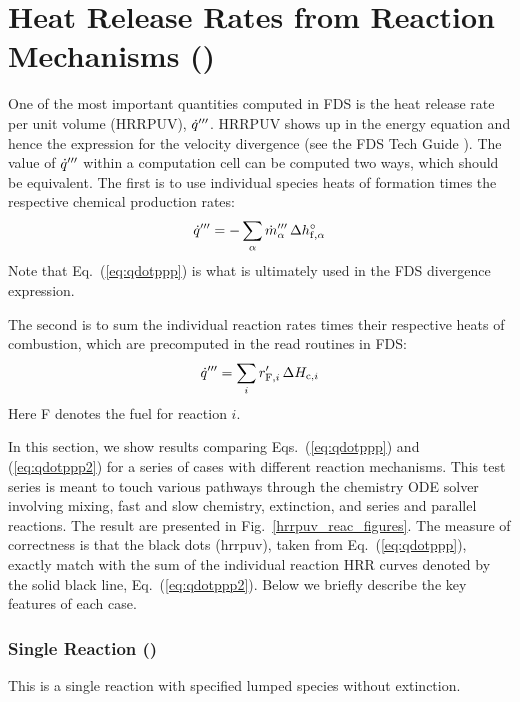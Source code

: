 \documentclass[11pt]{book}
\begin{document}
\clearpage

\section{Heat Release Rates from Reaction Mechanisms ()}
\label{hrrpuv_reac}
\label{hrrpuv_reac_arrhenius}
\label{hrrpuv_reac_extinction}
\label{hrrpuv_reac_parallel}
\label{hrrpuv_reac_parallel_2}
\label{hrrpuv_reac_series}
\label{hrrpuv_reac_simple}
\label{hrrpuv_reac_single}
\label{hrrpuv_reac_soot}

One of the most important quantities computed in FDS is the heat release rate per unit volume (HRRPUV), $\dot{q}^{{\prime\prime\prime}}$.  HRRPUV shows up in the energy equation and hence the expression for the velocity divergence (see the FDS Tech Guide \cite{FDS_Math_Guide}).  The value of $\dot{q}^{{\prime\prime\prime}}$ within a computation cell can be computed two ways, which should be equivalent.  The first is to use individual species heats of formation times the respective chemical production rates:
\begin{equation}
\label{eq:qdotppp}
\dot{q}^{{\prime\prime\prime}} = - \sum_\alpha \dot{m}_\alpha^{{\prime\prime\prime}} \, \Delta h_{{\rm f},\alpha}^\circ
\end{equation}
Note that Eq.~(\ref{eq:qdotppp}) is what is ultimately used in the FDS divergence expression.

The second is to sum the individual reaction rates  times their respective heats of combustion, which are precomputed in the read routines in FDS:
\begin{equation}
\label{eq:qdotppp2}
\dot{q}^{{\prime\prime\prime}} = \sum_i r_{{\rm F},i}^\prime \, \Delta H_{{\rm c},i}
\end{equation}
Here F denotes the fuel for reaction $i$.

In this section, we show results comparing Eqs.~(\ref{eq:qdotppp}) and (\ref{eq:qdotppp2}) for a series of cases with different reaction mechanisms.  This test series is meant to touch various pathways through the chemistry ODE solver involving mixing, fast and slow chemistry, extinction, and series and parallel reactions.  The result are presented in Fig.~\ref{hrrpuv_reac_figures}.  The measure of correctness is that the black dots (hrrpuv), taken from Eq.~(\ref{eq:qdotppp}), exactly match with the sum of the individual reaction HRR curves denoted by the solid black line, Eq.~(\ref{eq:qdotppp2}). Below we briefly describe the key features of each case.

\subsubsection{Single Reaction ()} This is a single reaction with specified lumped species without extinction.
\end{document}
